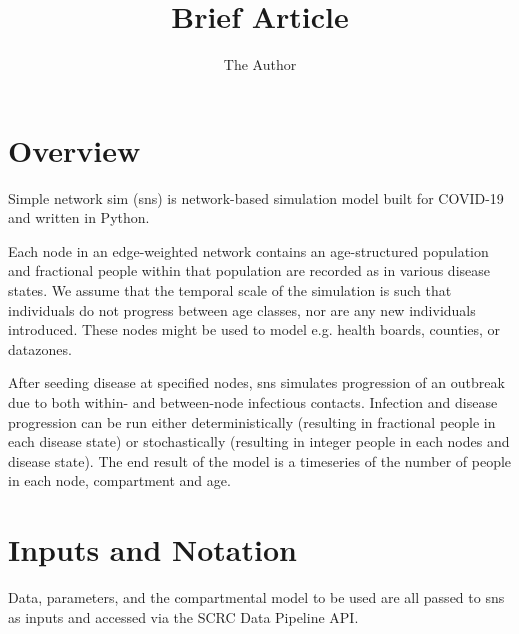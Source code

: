\documentclass[11pt]{article}
\title{Brief Article}
\author{The Author}
\begin{document}
\section{Overview}

Simple network sim (sns) is network-based simulation model built for COVID-19 and written in Python.

Each node in an edge-weighted network contains an age-structured population and fractional people within that population are recorded as in various disease states. We assume that the temporal scale of the simulation is such that individuals do not progress between age classes, nor are any new individuals introduced. These nodes might be used to model e.g. health boards, counties, or datazones.  

After seeding disease at specified nodes, sns simulates progression of an outbreak due to both within- and between-node infectious contacts.  Infection and disease progression can be run either deterministically (resulting in fractional people in each disease state) or stochastically (resulting in integer people in each nodes and disease state).  The end result of the model is a timeseries of the number of people in each node, compartment and age.

\section{Inputs and Notation}

Data, parameters, and the compartmental model to be used are all passed to sns as inputs and accessed via the SCRC Data Pipeline API.  
\end{document}
